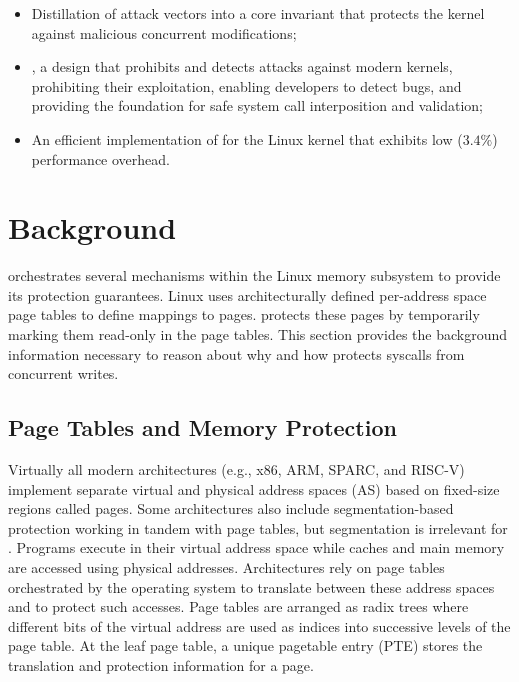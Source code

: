 \documentclass[letterpaper,twocolumn,10pt]{article}
\begin{document}
\begin{itemize}[noitemsep]
\item Distillation of \tocttou attack vectors into a core invariant that protects
the kernel against malicious concurrent modifications;
\item \midas, a design that prohibits and detects
\tocttou attacks against modern kernels, prohibiting their exploitation,
enabling developers to detect \tocttou bugs, and providing the foundation for
safe system call interposition and validation;
\item An efficient implementation of \midas for the Linux kernel that exhibits
low ($3.4\%$) performance overhead.
\end{itemize}


\section{Background}

\midas orchestrates several mechanisms within the Linux memory subsystem 
to provide its protection guarantees.
Linux uses architecturally defined per-address space page tables to define
mappings to pages.
\midas protects these pages by temporarily marking them read-only in the 
page tables.
This section provides the background information necessary to reason about 
why and how \midas protects syscalls from concurrent writes.


\subsection{Page Tables and Memory Protection}

Virtually all modern architectures (e.g., x86, ARM, SPARC, and 
RISC-V) implement separate virtual and physical
address spaces (AS) based on fixed-size regions called pages.
%
Some architectures also include segmentation-based protection 
working in tandem with page tables, but segmentation is irrelevant for \midas.
%
Programs execute in their virtual address space while caches and main memory
are accessed using physical addresses.
Architectures rely on page tables orchestrated by the operating system 
to translate between these address spaces and to protect such accesses.
Page tables are arranged as radix trees where different bits of the 
virtual address are used as indices into successive levels of the page table.
At the leaf page table, a unique pagetable entry (PTE) stores the 
translation and protection information for a page.
\end{document}
